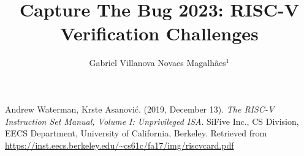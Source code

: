 \documentclass[letterpaper, 10pt, conference]{ieeeconf}
\title{\LARGE \bf Capture The Bug 2023: RISC-V Verification Challenges}
\author{Gabriel Villanova Novaes Magalhães$^{1}$}
\begin{document}
\maketitle
\thispagestyle{empty}
\pagestyle{empty}

 





\addtolength{\textheight}{-12cm}

\begin{thebibliography}{99}

Andrew Waterman, Krste Asanovi\'c. (2019, December 13). \textit{The RISC-V Instruction Set Manual, Volume I: Unprivileged ISA}. SiFive Inc., CS Division, EECS Department, University of California, Berkeley. Retrieved from \url{https://inst.eecs.berkeley.edu/~cs61c/fa17/img/riscvcard.pdf}


\end{thebibliography}


\end{document}
